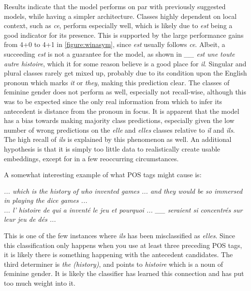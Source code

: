 \documentclass[11pt]{article}
\begin{document}
Results indicate that the model performs on par with previously suggested models, while having a simpler architecture.
Classes highly dependent on local context, such as \emph{ce}, perform especially well, which is likely due to \emph{est} being a good indicator for its presence.
This is supported by the large performance gains from 4+0 to 4+1 in \cref{figure:winasym}, since \emph{est} usually follows \emph{ce}.
Albeit, a succeeding \emph{est} is not a guarantee for the model, as shown in \emph{\_\_ est une toute autre histoire}, which it for some reason believe is a good place for \emph{il}.
Singular and plural classes rarely get mixed up, probably due to its condition upon the English pronoun which marks \emph{it} or \emph{they}, making this prediction clear.
The classes of feminine gender does not perform as well, especially not recall-wise, although this was to be expected since the only real information from which to infer its antecedent is distance from the pronoun in focus.
It is apparent that the model has a bias towards making majority class predictions, especially given the low number of wrong predictions on the \emph{elle} and \emph{elles} classes relative to \emph{il} and \emph{ils}.
The high recall of \emph{ils} is explained by this phenomenon as well.
An additional hypothesis is that it is simply too little data to realistically create usable embeddings, except for in a few reoccurring circumstances.

A somewhat interesting example of what POS tags might cause is:

\emph{... which is the history of who invented games ... and they would be so immersed in playing the dice games ...} \\
\emph{... l' histoire de qui a inventé le jeu et pourquoi ... \_\_ seraient si concentrés sur leur jeu de dés ...}

This is one of the few instances where \emph{ils} has been misclassified as \emph{elles}. Since this classification only happens when you use at least three preceding POS tags, it is likely there is something happening with the antecedent candidates. The third determiner is \emph{the (history)}, and points to \emph{histoire} which is a noun of feminine gender. It is likely the classifier has learned this connection and has put too much weight into it.
\end{document}
